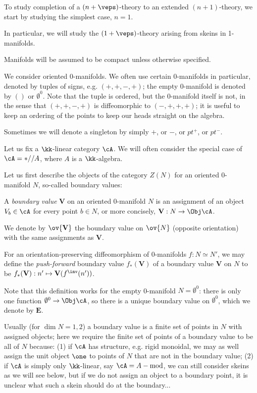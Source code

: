 \documentclass[12pt]{article}
\newcommand{\empt}[1]{{\emptyset^{#1}}}
\newcommand{\VV}{{\mathbf{V}}}
\newcommand{\EE}{{\mathbf{E}}}
\begin{document}
To study completion of a $(n+\veps)$-theory
to an extended $(n+1)$-theory,
we start by studying the simplest case, $n = 1$.

In particular, we will study the $(1+\veps)$-theory
arising from skeins in 1-manifolds.

Manifolds will be assumed to be compact
unless otherwise specified.

We consider oriented 0-manifolds.
We often use certain 0-manifolds in particular,
denoted by tuples of signs, e.g. $(+,+,-,+)$;
the empty 0-manifold is denoted by $()$ or $\empt{0}$.
Note that the tuple is ordered, but the 0-manifold itself
is not, in the sense that
$(+,+,-,+)$ is diffeomorphic to $(-,+,+,+)$;
it is useful to keep an ordering of the points
to keep our heads straight on the algebra.

Sometimes we will denote a singleton by simply $+$,
or $-$, or $pt^+$, or $pt^-$.

Let us fix a $\kk$-linear category $\cA$.
We will often consider the special case of
$\cA = *//A$, where $A$ is a $\kk$-algebra.

Let us first describe the objects of the category
$Z(N)$ for an oriented 0-manifold $N$,
so-called boundary values:

\begin{definition}
A \emph{boundary value} $\VV$ on an oriented 0-manifold $N$
is an assignment of an object $V_b \in \cA$
for every point $b \in N$,
or more concisely, $\VV: N \to \Obj \cA$.

We denote by $\ov{\VV}$ the boundary value on $\ov{N}$
(opposite orientation) with the same assignments as $\VV$.

For an orientation-preserving diffeomorphism of 0-manifolds
$f: N \simeq N'$,
we may define the \emph{push-forward} boundary value
$f_*(\VV)$ of a boundary value $\VV$ on $N$
to be $f_*(\VV): n' \mapsto \VV(f^\inv(n'))$.
\end{definition}

Note that this definition works for the empty 0-manifold
$N = \empt{0}$: there is only one function $\empt{0} \to \Obj \cA$,
so there is a unique boundary value on $\empt{0}$,
which we denote by $\EE$.

\begin{remark}
\label{r:boundary-value}
Usually (for $\dim N = 1,2$)
a boundary value is a finite set of points in $N$
with assigned objects;
here we require the finite set of points of a boundary value
to be all of $N$ because:
(1) if $\cA$ has structure, e.g. rigid monoidal,
we may as well assign the unit object $\one$ to points
of $N$ that are not in the boundary value;
(2) if $\cA$ is simply only $\kk$-linear,
say $\cA = A-\text{mod}$,
we can still consider skeins as we will see below,
but if we do not assign an object to a boundary point,
it is unclear what such a skein should do at the boundary...
\end{remark}
\end{document}
